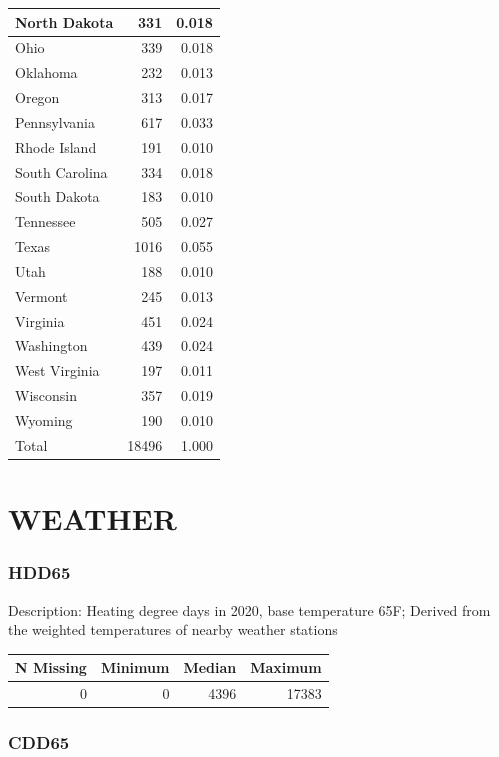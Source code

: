 \documentclass[
]{krantz}
\begin{document}
\begin{tabular}[t]{l|r|r}
\hline
North Dakota & 331 & 0.018\\
\hline
Ohio & 339 & 0.018\\
\hline
Oklahoma & 232 & 0.013\\
\hline
Oregon & 313 & 0.017\\
\hline
Pennsylvania & 617 & 0.033\\
\hline
Rhode Island & 191 & 0.010\\
\hline
South Carolina & 334 & 0.018\\
\hline
South Dakota & 183 & 0.010\\
\hline
Tennessee & 505 & 0.027\\
\hline
Texas & 1016 & 0.055\\
\hline
Utah & 188 & 0.010\\
\hline
Vermont & 245 & 0.013\\
\hline
Virginia & 451 & 0.024\\
\hline
Washington & 439 & 0.024\\
\hline
West Virginia & 197 & 0.011\\
\hline
Wisconsin & 357 & 0.019\\
\hline
Wyoming & 190 & 0.010\\
\hline
Total & 18496 & 1.000\\
\hline
\end{tabular}

\hypertarget{weather}{%
\section{WEATHER}\label{weather}}

\hypertarget{hdd65}{%
\subsubsection*{HDD65}\label{hdd65}}


Description: Heating degree days in 2020, base temperature 65F; Derived from the weighted temperatures of nearby weather stations

\begin{tabular}[t]{r|r|r|r}
\hline
N Missing & Minimum & Median & Maximum\\
\hline
0 & 0 & 4396 & 17383\\
\hline
\end{tabular}

\hypertarget{cdd65}{%
\subsubsection*{CDD65}\label{cdd65}}
\end{document}
